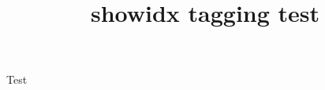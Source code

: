 \documentclass{article}
\title{showidx tagging test}
\begin{document}
Test
\printindex
\end{document}
